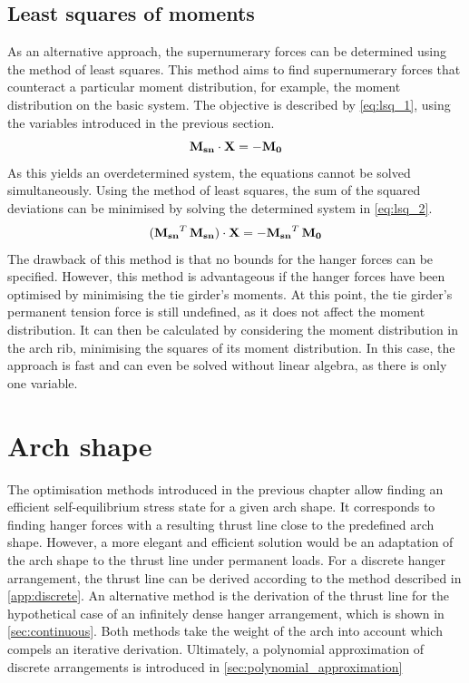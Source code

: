 \subsection{Least squares of moments} \label{sec:least_squares}
As an alternative approach, the supernumerary forces can be determined using the method of least squares. This method aims to find supernumerary forces that counteract a particular moment distribution, for example, the moment distribution on the basic system. The objective is described by \cref{eq:lsq_1}, using the variables introduced in the previous section.
\begin{equation}
    {\bf M_{sn}} \cdot {\bf X} = -{\bf M_0}
    \label{eq:lsq_1}
\end{equation}
As this yields an overdetermined system, the equations cannot be solved simultaneously. Using the method of least squares, the sum of the squared deviations can be minimised by solving the determined system in \cref{eq:lsq_2}.
\begin{equation}
    ({\bf M_{sn}}^T\,{\bf M_{sn}}) \cdot {\bf X} = -{\bf M_{sn}}^T\,{\bf M_0}
    \label{eq:lsq_2}
\end{equation}
The drawback of this method is that no bounds for the hanger forces can be specified. However, this method is advantageous if the hanger forces have been optimised by minimising the tie girder's moments. At this point, the tie girder's permanent tension force is still undefined, as it does not affect the moment distribution. It can then be calculated by considering the moment distribution in the arch rib, minimising the squares of its moment distribution. In this case, the approach is fast and can even be solved without linear algebra, as there is only one variable.


\newpage
\section{Arch shape} \label{sec:met_arch}
The optimisation methods introduced in the previous chapter allow finding an efficient self-equilibrium stress state for a given arch shape. It corresponds to finding hanger forces with a resulting thrust line close to the predefined arch shape. However, a more elegant and efficient solution would be an adaptation of the arch shape to the thrust line under permanent loads. 
For a discrete hanger arrangement, the thrust line can be derived according to the method described in \cref{app:discrete}. 
An alternative method is the derivation of the thrust line for the hypothetical case of an infinitely dense hanger arrangement, which is shown in \cref{sec:continuous}.
Both methods take the weight of the arch into account which compels an iterative derivation.
Ultimately, a polynomial approximation of discrete arrangements is introduced in \cref{sec:polynomial_approximation}

